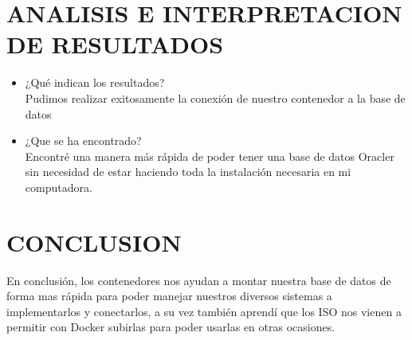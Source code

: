 \documentclass[preprint,12pt]{elsarticle}
\begin{document}
\section{ANALISIS E INTERPRETACION DE RESULTADOS }
\begin{itemize}
	\item ¿Qué indican los resultados? \\
	Pudimos realizar exitosamente la conexión de nuestro contenedor a la base de datos
	\item ¿Que se ha encontrado?\\
	Encontré una manera más rápida de poder tener una base de datos Oracler sin necesidad de estar haciendo toda la instalación necesaria en mi computadora.
\end{itemize}


\section{CONCLUSION}
En conclusión, los contenedores nos ayudan a montar nuestra base de datos de forma mas rápida para poder manejar nuestros diversos sistemas a implementarlos y conectarlos, a su vez también aprendí que los ISO nos vienen a permitir con Docker subirlas para poder usarlas en otras ocasiones.
\end{document}
